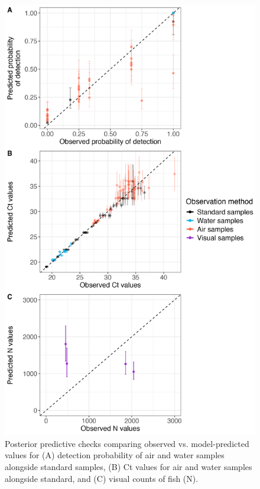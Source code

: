 \documentclass{article}
\begin{document}
\clearpage
\begin{figure}[tbhp] 
\centering
\includegraphics[width=12.0cm]{Plots/Diagnostic_Fig_3.jpg}  
\caption{Posterior predictive checks comparing observed vs. model-predicted values for (A) detection probability of air and water samples alongside standard samples, (B) Ct values for air and water samples alongside standard, and (C) visual counts of fish (N).}
\label{fig:postpred}
\end{figure}

\end{document}
